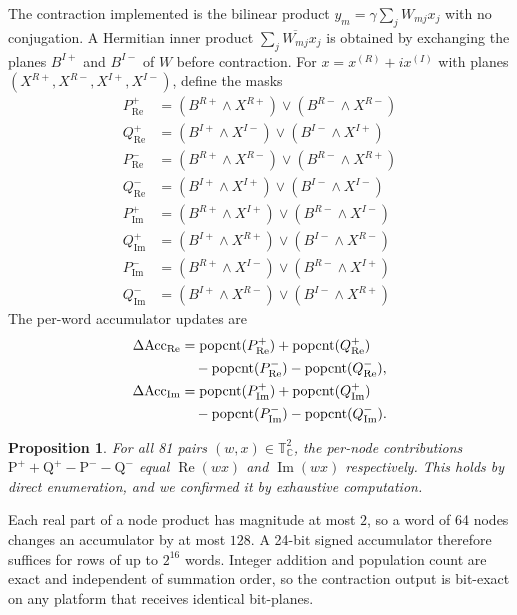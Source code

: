 \documentclass[10pt, twocolumn, a4paper]{article}
\newtheorem{proposition}{Proposition}
\begin{document}
The contraction implemented is the bilinear product $y_m=\gamma\sum_j W_{mj}x_j$ with no conjugation. A Hermitian inner product $\sum_j\overline{W_{mj}}x_j$ is obtained by exchanging the planes $B^{I+}$ and $B^{I-}$ of $W$ before contraction. For $x=x^{(R)}+ix^{(I)}$ with planes $(X^{R+},X^{R-},X^{I+},X^{I-})$, define the masks
\begin{align}
P_{\text{Re}}^+ &= (B^{R+}\land X^{R+})\lor(B^{R-}\land X^{R-})\\
Q_{\text{Re}}^+ &= (B^{I+}\land X^{I-})\lor(B^{I-}\land X^{I+})\\
P_{\text{Re}}^- &= (B^{R+}\land X^{R-})\lor(B^{R-}\land X^{R+})\\
Q_{\text{Re}}^- &= (B^{I+}\land X^{I+})\lor(B^{I-}\land X^{I-})\\
P_{\text{Im}}^+ &= (B^{R+}\land X^{I+})\lor(B^{R-}\land X^{I-})\\
Q_{\text{Im}}^+ &= (B^{I+}\land X^{R+})\lor(B^{I-}\land X^{R-})\\
P_{\text{Im}}^- &= (B^{R+}\land X^{I-})\lor(B^{R-}\land X^{I+})\\
Q_{\text{Im}}^- &= (B^{I+}\land X^{R-})\lor(B^{I-}\land X^{R+})
\end{align}
The per-word accumulator updates are
\begin{align}
\Delta\text{Acc}_{\text{Re}} &= \text{popcnt}(P_{\text{Re}}^+)+\text{popcnt}(Q_{\text{Re}}^+)\notag\\ &\quad-\text{popcnt}(P_{\text{Re}}^-)-\text{popcnt}(Q_{\text{Re}}^-),\\
\Delta\text{Acc}_{\text{Im}} &= \text{popcnt}(P_{\text{Im}}^+)+\text{popcnt}(Q_{\text{Im}}^+)\notag\\ &\quad-\text{popcnt}(P_{\text{Im}}^-)-\text{popcnt}(Q_{\text{Im}}^-).
\end{align}

\begin{proposition}
For all 81 pairs $(w,x)\in\mathbb{T}_{\mathbb{C}}^2$, the per-node contributions $\text{P}^+ + \text{Q}^+ - \text{P}^- - \text{Q}^-$ equal $\operatorname{Re}(wx)$ and $\operatorname{Im}(wx)$ respectively. This holds by direct enumeration, and we confirmed it by exhaustive computation.
\end{proposition}

Each real part of a node product has magnitude at most $2$, so a word of 64 nodes changes an accumulator by at most $128$. A 24-bit signed accumulator therefore suffices for rows of up to $2^{16}$ words. Integer addition and population count are exact and independent of summation order, so the contraction output is bit-exact on any platform that receives identical bit-planes.
\end{document}
